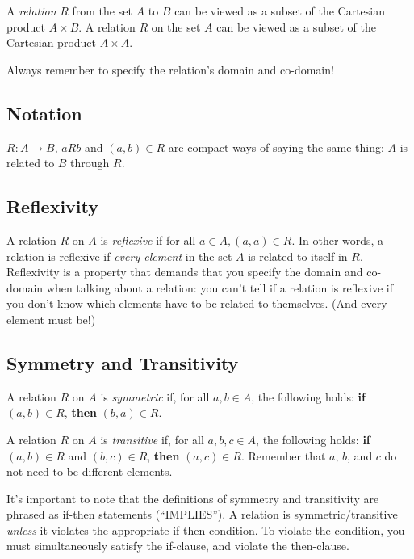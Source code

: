 \documentclass[12pt,letterpaper]{article}
\newcommand\Z{\mathbb Z}
\begin{document}
    A \textit{relation} $R$ from the set $A$ to $B$ can be viewed as a subset of the Cartesian product $A \times B$. A relation $R$ on the set $A$ can be viewed as a subset of the Cartesian product $A \times A$. 
    
    Always remember to specify the relation's domain and co-domain!
    
    \subsection{Notation}
    
    $R: A \rightarrow B$, $a R b$ and $(a,b) \in R$ are compact ways of saying the same thing: $A$ is related to $B$ through $R$.
    
    
    \subsection{Reflexivity}
    
    A relation $R$ on $A$ is \textit{reflexive} if for all $a \in A, (a,a) \in R$. In other words, a relation is reflexive if \emph{every element} in the set $A$ is related to itself in $R$. Reflexivity is a property that demands that you specify the domain and co-domain when talking about a relation: you can't tell if a relation is reflexive if you don't know which elements have to be related to themselves. (And every element must be!)

    \subsection{Symmetry and Transitivity}
    A relation $R$ on $A$ is \textit{symmetric} if, for all $a,b \in A$, the following holds: \textbf{if} $(a,b) \in R$, \textbf{then} $(b,a) \in R$. 
    
    A relation $R$ on $A$ is \textit{transitive} if, for all $a,b,c \in A$, the following holds: \textbf{if} $(a,b) \in R$ and $(b,c) \in R$, \textbf{then} $(a,c) \in R$. Remember that $a$, $b$, and $c$ do not need to be different elements.
    
    It's important to note that the definitions of symmetry and transitivity are phrased as if-then statements (``IMPLIES''). A relation is symmetric/transitive \emph{unless} it violates the appropriate if-then condition. To violate the condition, you must simultaneously satisfy the if-clause, and violate the then-clause. 
    
\end{document}
